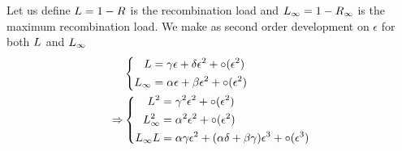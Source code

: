 \documentclass{article}
\begin{document}
Let us define $L = 1 - R $ is the recombination load and $L_{\infty} = 1 - {R_{\infty}} $ is the maximum recombination load.
We make as second order development on $\epsilon$ for both $L$ and $L_{\infty}$
\begin{align}
&\left\{
  \begin{aligned}
         L &= \gamma \epsilon + \delta \epsilon^2 + \circ ( \epsilon^2) \\
         L_{\infty} &= \alpha \epsilon + \beta \epsilon^2 + \circ ( \epsilon^2)  \\
  \end{aligned}
   \right.
   \\ \Rightarrow
&\left\{
  \begin{aligned}
         L^2 &= \gamma^2 \epsilon^2 + \circ ( \epsilon^2) \\
         L_{\infty}^2 &= \alpha^2 \epsilon^2 + \circ ( \epsilon^2)  \\
         L_{\infty} L&= \alpha \gamma \epsilon^2 + (\alpha \delta + \beta \gamma)  \epsilon^3 + \circ ( \epsilon^3)   \\
  \end{aligned}
   \right.
\end{align}
\end{document}
